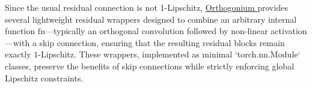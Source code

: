 \documentclass[10pt]{article}
\theoremstyle{plain}
\theoremstyle{definition}
\theoremstyle{remark}
\newcommand{\thib}[1]{{\color{blue}[thib]: #1}}
\newcommand{\franck}[1]{{\color{red}[franck]: #1}}
\newcommand{\thib}[1]{}
\newcommand{\franck}[1]{}
\newcommand{\Orthogonium}{ \href{https://github.com/deel-ai/orthogonium/}{Orthogonium }}
\begin{document}

Since the usual residual connection is not 1-Lipschitz, \Orthogonium provides several lightweight residual wrappers designed to combine an arbitrary internal function $\mathrm{fn}$—typically an orthogonal convolution followed by non-linear activation—with a skip connection, ensuring that the resulting residual blocks remain exactly $1$-Lipschitz. These wrappers, implemented as minimal `torch.nn.Module` classes, preserve the benefits of skip connections while strictly enforcing global Lipschitz constraints.




\end{document}
